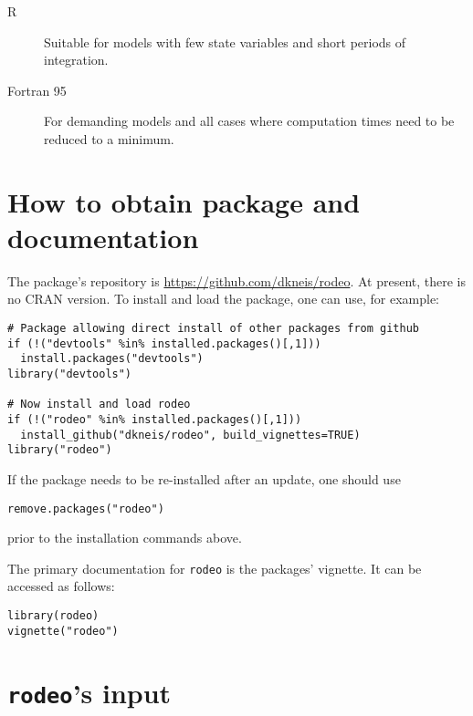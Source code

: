 \documentclass[a4paper]{article}
\newcommand{\rodeo}{\texttt{rodeo}}
\begin{document}
\begin{description}
 \item [R] Suitable for models with few state variables and short periods of integration.
 \item [Fortran 95] For demanding models and all cases where computation times need to be reduced to a minimum.
\end{description}


\section{How to obtain package and documentation} \label{sec:obtain}

The package's repository is \url{https://github.com/dkneis/rodeo}. At present, there is no CRAN version. To install and load the package, one can use, for example:

\begin{verbatim}
# Package allowing direct install of other packages from github
if (!("devtools" %in% installed.packages()[,1]))
  install.packages("devtools")
library("devtools")

# Now install and load rodeo
if (!("rodeo" %in% installed.packages()[,1]))
  install_github("dkneis/rodeo", build_vignettes=TRUE)
library("rodeo")
\end{verbatim}

If the package needs to be re-installed after an update, one should use

\begin{verbatim}
remove.packages("rodeo")
\end{verbatim}

prior to the installation commands above.

The primary documentation for \rodeo{} is the packages' vignette. It can be accessed as follows:

\begin{verbatim}
library(rodeo)
vignette("rodeo")
\end{verbatim}


\section{\rodeo{}'s input} \label{sec:input}
\end{document}
